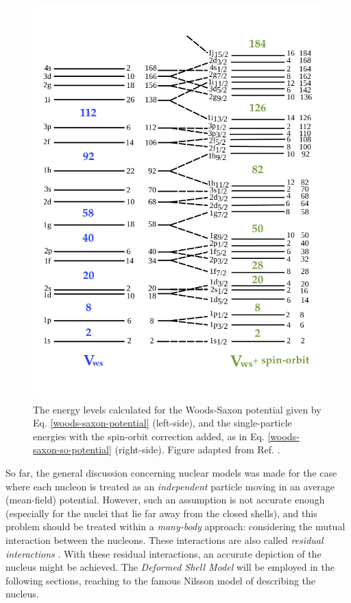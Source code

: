 \begin{figure}
    \centering
    \includegraphics[width=0.99\textwidth]{Chapters/Figures/energy_levels_WS.png}
    \caption{The energy levels calculated for the Woods-Saxon potential given by Eq. \ref{woods-saxon-potential} (left-side), and the single-particle energies with the spin-orbit correction added, as in Eq. \ref{woods-saxon-so-potential} (right-side). Figure adapted from Ref. \cite{lewis2019lifetime}.}
    \label{woods-saxon-energy-levels}
\end{figure}

So far, the general discussion concerning nuclear models was made for the case where each nucleon is treated as an \emph{independent} particle moving in an average (mean-field) potential. However, such an assumption is not accurate enough (especially for the nuclei that lie far away from the closed shells), and this problem should be treated within a \emph{many-body} approach: considering the mutual interaction between the nucleons. These interactions are also called \emph{residual interactions} \cite{casten2000nuclear,bertulani2007nuclear}. With these residual interactions, an accurate depiction of the nucleus might be achieved. The \emph{Deformed Shell Model} will be employed in the following sections, reaching to the famous Nilsson model of describing the nucleus.

